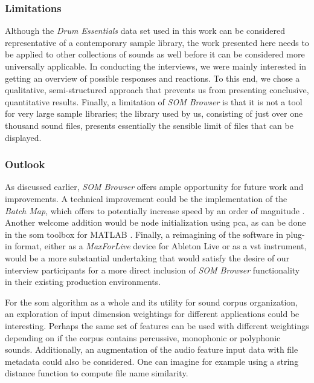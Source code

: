 \subsubsection{Limitations}
\label{subsubsec:discussion_limitations}
Although the \textit{Drum Essentials} data set used in this work can be
considered representative of a contemporary sample library, the work presented
here needs to be applied to other collections of sounds as well before it can
be considered more universally applicable. In conducting the interviews, we were
mainly interested in getting an overview of possible responses and reactions.
To this end, we chose a qualitative, semi-structured approach that prevents us
from presenting conclusive, quantitative results. Finally, a limitation of
\textit{SOM Browser} is that it is not a tool for very large sample libraries;
the library used by us, consisting of just over one thousand sound files,
presents essentially the sensible limit of files that can be displayed.

\subsubsection{Outlook}
\label{subsubsec:discussion_outlook}
As discussed earlier, \textit{SOM Browser} offers ample opportunity for future
work and improvements. A technical improvement could be the implementation of
the \textit{Batch Map}, which offers to potentially increase speed by an order
of magnitude \citep{web:kohonen2007}. Another welcome addition would be node
initialization using \gls{pca}, as can be done in the \gls{som} toolbox for
MATLAB \citep{vesanto2000}. Finally, a reimagining of the software in plug-in
format, either as a \textit{MaxForLive} device for Ableton Live or as a
\gls{vst} instrument, would be a more substantial undertaking that would satisfy
the desire of our interview participants for a more direct inclusion of
\textit{SOM Browser} functionality in their existing production environments.

\smallskip

For the \gls{som} algorithm as a whole and its utility for sound corpus
organization, an exploration of input dimension weightings for different
applications could be interesting. Perhaps the same set of features can be used
with different weightings depending on if the corpus contains percussive,
monophonic or polyphonic sounds. Additionally, an augmentation of the audio
feature input data with file metadata could also be considered. One can imagine
for example using a string distance function to compute file name similarity.


